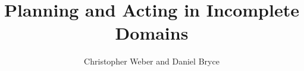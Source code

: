 \documentclass{article}
\begin{document}
\title{Planning and Acting in Incomplete Domains}

\author{Christopher Weber and Daniel Bryce}




\maketitle
\end{document}
